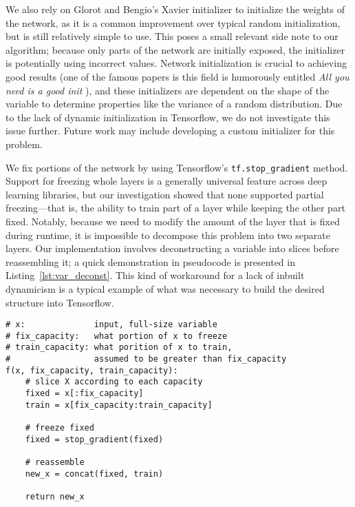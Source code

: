 We also rely on Glorot and Bengio's Xavier initializer \cite{glorot2010understanding} to initialize the weights of the network, as it is a common improvement over typical random initialization, but is still relatively simple to use.
This poses a small relevant side note to our algorithm; because only parts of the network are initially exposed, the initializer is potentially using incorrect values.
Network initialization is crucial to achieving good results (one of the famous papers is this field is humorously entitled \emph{All you need is a good init} \cite{mishkin2015all}), and these initializers are dependent on the shape of the variable to determine properties like the variance of a random distribution.
Due to the lack of dynamic initialization in Tensorflow, we do not investigate this issue further.
Future work may include developing a custom initializer for this problem.

We fix portions of the network by using Tensorflow's \texttt{tf.stop\_gradient} method.
Support for freezing whole layers is a generally universal feature across deep learning libraries, but our investigation showed that none supported partial freezing---that is, the ability to train part of a layer while keeping the other part fixed.
Notably, because we need to modify the amount of the layer that is fixed during runtime, it is impossible to decompose this problem into two separate layers.
Our implementation involves deconstructing a variable into slices before reassembling it; a quick demonstration in pseudocode is presented in Listing~\ref{lst:var_deconst}.
This kind of workaround for a lack of inbuilt dynamicism is a typical example of what was necessary to build the desired structure into Tensorflow.

\begin{lstlisting}[caption={Variable Deconstruction}, label={lst:var_deconst}, captionpos=b]
# x:              input, full-size variable
# fix_capacity:   what portion of x to freeze
# train_capacity: what porition of x to train,
#                 assumed to be greater than fix_capacity
f(x, fix_capacity, train_capacity):
    # slice X according to each capacity
    fixed = x[:fix_capacity]
    train = x[fix_capacity:train_capacity]

    # freeze fixed
    fixed = stop_gradient(fixed)

    # reassemble 
    new_x = concat(fixed, train)

    return new_x
\end{lstlisting}

